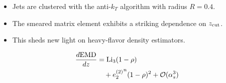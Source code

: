 \begin{itemize}
  \item Jets are clustered with the anti-$k_T$ algorithm with radius $R = 0.4$.
  \item The smeared matrix element exhibits a striking dependence on $z_{\rm cut}$.
  \item This sheds new light on heavy-flavor density estimators.
\end{itemize}

\begin{align}
  \frac{d \mathrm{EMD}}{d z} &= \mathrm{Li}_{3}(1 - \rho) \nonumber \\
  &\quad + {e_2^{(2)}}^{n} (1 - \rho)^{2} + \mathcal{O}(\alpha_s^3) \label{eq:3}
\end{align}

